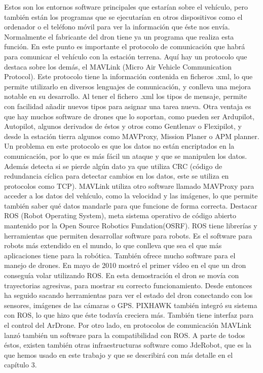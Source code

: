 Estos son los entornos software principales que estarían sobre el vehículo, pero
también están los programas que se ejecutarían en otros dispositivos como el ordenador
o el teléfono móvil para ver la información que éste nos envía. Normalmente el
fabricante del dron tiene ya un programa que realiza esta función.
En este punto es importante el protocolo de comunicación que habrá para
comunicar el vehículo con la estación terrena. Aquí hay un protocolo que destaca
sobre los demás, el MAVLink (Micro Air Vehicle Communication Protocol). Este
protocolo tiene la información contenida en ficheros .xml, lo que permite utilizarlo en
diversos lenguajes de comunicación, y conlleva una mejora notable en su desarrollo. Al
tener el fichero .xml los tipos de mensaje, permite con facilidad añadir nuevos tipos
para asignar una tarea nueva. Otra ventaja es que hay muchos software de drones
que lo soportan, como pueden ser Ardupilot, Autopilot, algunos derivados de éstos y
otros como Gentlenav o Flexipilot, y desde la estación tierra algunos como MAVProxy,
Mission Planer o APM planner. Un problema en este protocolo es que los datos no están
encriptados en la comunicación, por lo que es más fácil un ataque y que se manipulen
los datos. Además detecta si se pierde algún dato ya que utiliza CRC (código de
redundancia cíclica para detectar cambios en los datos, este se utiliza en protocolos
como TCP). MAVLink utiliza otro software llamado MAVProxy para acceder a los
datos del vehículo, como la velocidad y las imágenes, lo que permite también saber qué
datos mandarle para que funcione de forma correcta.
Destacar ROS (Robot Operating System), meta sistema operativo de código
abierto mantenido por la Open Source Robotics Fundation(OSRF). ROS tiene librerías
y herramientas que permiten desarrollar software para robots. Es el software para
robots más extendido en el mundo, lo que conlleva que sea el que más aplicaciones
tiene para la robótica. También ofrece mucho software para el manejo de drones. En
mayo de 2010 mostró el primer vídeo en el que un dron conseguía volar utilizando
ROS. En esta demostración el dron se movía con trayectorias agresivas, para mostrar
su correcto funcionamiento. Desde entonces ha seguido sacando herramientas para
ver el estado del dron conectando con los sensores, imágenes de las cámaras o GPS.
PIXHAWK también integró su sistema con ROS, lo que hizo que éste todavía creciera
más. También tiene interfaz para el control del ArDrone. Por otro lado, en protocolos
de comunicación MAVLink lanzó también un software para la compatibilidad con ROS.
A parte de todos éstos, existen también otras infraestructuras software como
JdeRobot, que es la que hemos usado en este trabajo y que se describirá con más detalle
en el capítulo 3.

